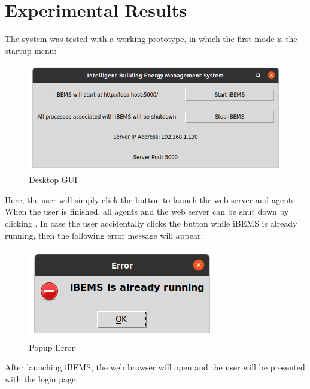 \documentclass[conference]{IEEEtran}
\begin{document}
\section{Experimental Results}
The system was tested with a working prototype, in which the first mode is the startup menu:

\begin{figure}[htbp]
    \centering
    \includegraphics[scale=0.2]{figs/GUI/BEMS_GUI_Linux.png}
    \caption{Desktop GUI}
    \label{fig:desktopgui}
\end{figure}

\noindent
Here, the user will simply click the  button to launch the web server and agents. When the user is finished, all agents and the web server can be shut down by clicking . In case the user accidentally clicks the  button while iBEMS is already running, then the following error message will appear:

\begin{figure}[htbp]
    \centering
    \includegraphics[scale=0.5]{figs/GUI/BEMS_GUI_Linux_Warning.png}
    \caption{Popup Error}
    \label{fig:popuperror}
\end{figure}

\noindent
After launching iBEMS, the web browser will open and the user will be presented with the login page:
\end{document}

